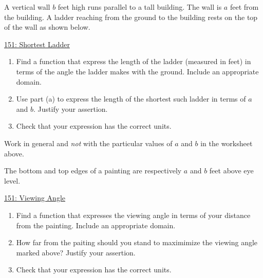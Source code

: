 \documentclass{ximera}
\begin{document}
\begin{question}  \label{Q0t0gogppdga}

A vertical wall $b$ feet high runs parallel to a tall building. The wall is $a$ feet from the building. A ladder reaching from the ground to the building rests on the top of the wall as shown below.

\begin{onlineOnly}
   \begin{center}
\end{center}
\end{onlineOnly}

\href{https://www.desmos.com/calculator/4ak46ub8ay}{151: Shortest Ladder}


\begin{enumerate}
\item Find a function that express the length of the ladder (measured in feet) in terms of the angle the ladder makes with the ground. Include an appropriate domain.

\item Use part (a) to express the length of the shortest such ladder in terms of $a$ and $b$. Justify your assertion. 

\item Check that your expression has the correct units.

\end{enumerate}

Work in general and \emph{not} with the particular values of $a$ and $b$ in the worksheet above.

\end{question} 


\begin{question}  \label{Q677jhgjhjfdbn}
The bottom and top edges of a painting are respectively $a$ and $b$ feet above eye level.

\begin{onlineOnly}
   \begin{center}
\end{center}
\end{onlineOnly}

\href{https://www.desmos.com/calculator/dkqndsegod}{151: Viewing Angle}


\begin{enumerate}
\item Find a function that expresses the viewing angle in terms of your distance from the painting. Include an appropriate domain.

\item How far from the paiting should you stand to maximimize the viewing angle marked above? Justify your assertion.

\item Check that your expression has the correct units.

\end{enumerate}
\end{question}
\end{document}
